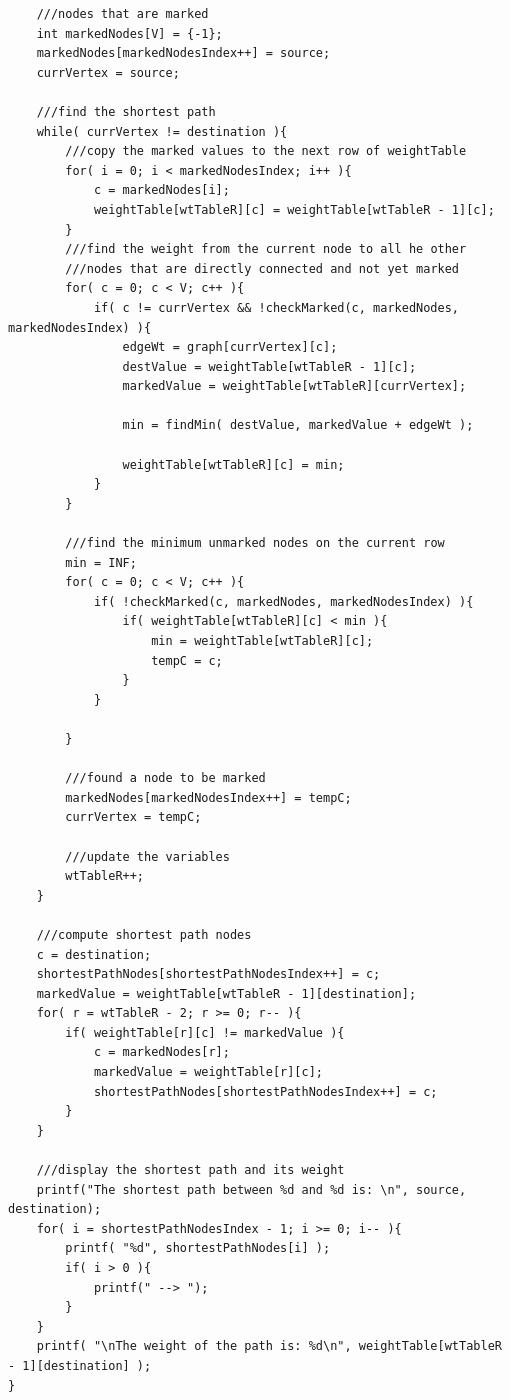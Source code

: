\documentclass[14pt]{article}
\begin{document}
\begin{lstlisting}
    ///nodes that are marked
    int markedNodes[V] = {-1};
    markedNodes[markedNodesIndex++] = source;
    currVertex = source;

    ///find the shortest path
    while( currVertex != destination ){
        ///copy the marked values to the next row of weightTable
        for( i = 0; i < markedNodesIndex; i++ ){
            c = markedNodes[i];
            weightTable[wtTableR][c] = weightTable[wtTableR - 1][c];
        }
        ///find the weight from the current node to all he other
        ///nodes that are directly connected and not yet marked
        for( c = 0; c < V; c++ ){
            if( c != currVertex && !checkMarked(c, markedNodes, markedNodesIndex) ){
                edgeWt = graph[currVertex][c];
                destValue = weightTable[wtTableR - 1][c];
                markedValue = weightTable[wtTableR][currVertex];

                min = findMin( destValue, markedValue + edgeWt );

                weightTable[wtTableR][c] = min;
            }
        }

        ///find the minimum unmarked nodes on the current row
        min = INF;
        for( c = 0; c < V; c++ ){
            if( !checkMarked(c, markedNodes, markedNodesIndex) ){
                if( weightTable[wtTableR][c] < min ){
                    min = weightTable[wtTableR][c];
                    tempC = c;
                }
            }
            
        }

        ///found a node to be marked
        markedNodes[markedNodesIndex++] = tempC;
        currVertex = tempC;

        ///update the variables
        wtTableR++;
    }

    ///compute shortest path nodes
    c = destination;
    shortestPathNodes[shortestPathNodesIndex++] = c;
    markedValue = weightTable[wtTableR - 1][destination];
    for( r = wtTableR - 2; r >= 0; r-- ){
        if( weightTable[r][c] != markedValue ){
            c = markedNodes[r];
            markedValue = weightTable[r][c];
            shortestPathNodes[shortestPathNodesIndex++] = c;
        }
    }

    ///display the shortest path and its weight
    printf("The shortest path between %d and %d is: \n", source, destination);
    for( i = shortestPathNodesIndex - 1; i >= 0; i-- ){
        printf( "%d", shortestPathNodes[i] );
        if( i > 0 ){
            printf(" --> ");
        }
    }
    printf( "\nThe weight of the path is: %d\n", weightTable[wtTableR - 1][destination] );
}


\end{lstlisting}
\end{document}
